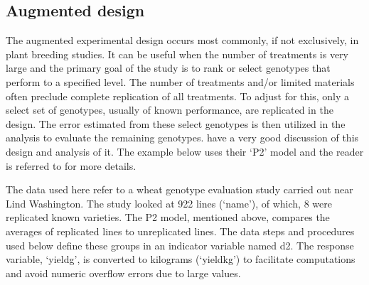 \documentclass[
]{book}
\newenvironment{Shaded}{\begin{snugshade}}{\end{snugshade}}
\newcommand{\NormalTok}[1]{#1}
\begin{document}
\begin{Shaded}
\end{Shaded}

\hypertarget{augmented-design-1}{%
\subsection{Augmented design}\label{augmented-design-1}}

The augmented experimental design occurs most commonly, if not exclusively, in plant breeding studies. It can be useful when the number of treatments is very large and the primary goal of the study is to rank or select genotypes that perform to a specified level. The number of treatments and/or limited materials often preclude complete replication of all treatments. To adjust for this, only a select set of genotypes, usually of known performance, are replicated in the design. The error estimated from these select genotypes is then utilized in the analysis to evaluate the remaining genotypes. \citet{Burgueno2018} have a very good discussion of this design and analysis of it. The example below uses their `P2' model and the reader is referred to \citet{Burgueno2018} for more details.

The data used here refer to a wheat genotype evaluation study carried out near Lind Washington. The study looked at 922 lines (`name'), of which, 8 were replicated known varieties. The P2 model, mentioned above, compares the averages of replicated lines to unreplicated lines. The data steps and procedures used below define these groups in an indicator variable named d2. The response variable, `yieldg', is converted to kilograms (`yieldkg') to facilitate computations and avoid numeric overflow errors due to large values.
\end{document}
